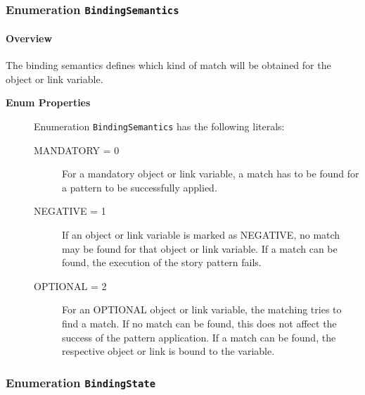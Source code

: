 \subsubsection{\Large{Enumeration \bfseries \texttt{BindingSemantics}\normalfont}}
\label{cls:modeling::patterns::BindingSemantics} 
\paragraph{Overview}
	
			
The binding semantics defines which kind of match will be obtained for the object or link variable.	
		
	


\begin{description}

	\item[\textbf{Enum Properties}] Enumeration \texttt{BindingSemantics} has the following literals:

	\begin{description}
		
		\item[MANDATORY = 0]
		\hspace{\fill}
		\nopagebreak
		
For a mandatory object or link variable, a match has to be found for a pattern to be successfully applied.	

		\item[NEGATIVE = 1]
		\hspace{\fill}
		\nopagebreak
		
If an object or link variable is marked as NEGATIVE, no match may be found for that object or link variable. If a match can be found, the execution of the story pattern fails.	

		\item[OPTIONAL = 2]
		\hspace{\fill}
		\nopagebreak
		
For an OPTIONAL object or link variable, the matching tries to find a match. If no match can be found, this does not affect the success of the pattern application. If a match can be found, the respective object or link is bound to the variable.	
 
	\end{description}

\end{description}



\subsubsection{\Large{Enumeration \bfseries \texttt{BindingState}\normalfont}}
\label{cls:modeling::patterns::BindingState} 

